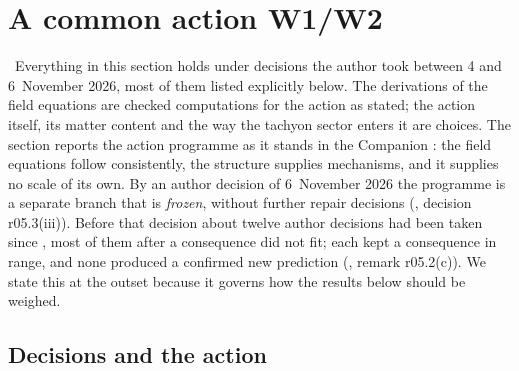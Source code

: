 \section{A common action W1/W2}
\label{sec:act}

\Conditional\ Everything in this section holds under decisions the author took between 4 and 6~November 2026, most of
them listed explicitly below. The derivations of the field equations are checked computations for the action as stated;
the action itself, its matter content and the way the tachyon sector enters it are choices. The section reports the
action programme as it stands in the Companion \cite{QSC}: the field equations follow consistently, the structure
supplies mechanisms, and it supplies no scale of its own. By an author decision of 6~November 2026 the programme is a
separate branch that is \emph{frozen}, without further repair decisions (, decision r05.3(iii)). Before that
decision about twelve author decisions had been taken since , most of them after a consequence did not fit;
each kept a consequence in range, and none produced a confirmed new prediction (, remark r05.2(c)). We state
this at the outset because it governs how the results below should be weighed.

\subsection{Decisions and the action}
\label{sec:act-decisions}

